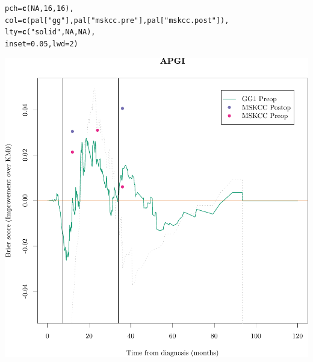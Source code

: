 \documentclass{article}\usepackage[]{graphicx}\usepackage[]{color}
\makeatletter
\def\maxwidth{ %
  \ifdim\Gin@nat@width>\linewidth
    \linewidth
  \else
    \Gin@nat@width
  \fi
}
\newcommand{\hlnum}[1]{\textcolor[rgb]{0.686,0.059,0.569}{#1}}%
\newcommand{\hlstr}[1]{\textcolor[rgb]{0.192,0.494,0.8}{#1}}%
\newcommand{\hlstd}[1]{\textcolor[rgb]{0.345,0.345,0.345}{#1}}%
\newcommand{\hlkwc}[1]{\textcolor[rgb]{0.333,0.667,0.333}{#1}}%
\newcommand{\hlkwd}[1]{\textcolor[rgb]{0.737,0.353,0.396}{\textbf{#1}}}%
\newenvironment{kframe}{%
 \def\at@end@of@kframe{}%
 \ifinner\ifhmode%
  \def\at@end@of@kframe{\end{minipage}}%
  \begin{minipage}{\columnwidth}%
 \fi\fi%
 \def\FrameCommand##1{\hskip\@totalleftmargin \hskip-\fboxsep
 \colorbox{shadecolor}{##1}\hskip-\fboxsep
     \hskip-\linewidth \hskip-\@totalleftmargin \hskip\columnwidth}%
 \MakeFramed {\advance\hsize-\width
   \@totalleftmargin\z@ \linewidth\hsize
   \@setminipage}}%
 {\par\unskip\endMakeFramed%
 \at@end@of@kframe}
\newenvironment{knitrout}{}{} %
\makeatother
\begin{document}
\begin{knitrout}
\begin{kframe}
\begin{alltt}
        \hlkwc{pch} \hlstd{=} \hlkwd{c}\hlstd{(}        \hlnum{NA}\hlstd{,}                     \hlnum{16}\hlstd{,}                             \hlnum{16}\hlstd{),}
        \hlkwc{col} \hlstd{=} \hlkwd{c}\hlstd{(        pal[}\hlstr{"gg"}\hlstd{],              pal[}\hlstr{"mskcc.pre"}\hlstd{],       pal[}\hlstr{"mskcc.post"}\hlstd{]),}
        \hlkwc{lty} \hlstd{=} \hlkwd{c}\hlstd{(}        \hlstr{"solid"}\hlstd{,}                \hlnum{NA}\hlstd{,}                             \hlnum{NA}\hlstd{),}
        \hlkwc{inset} \hlstd{=} \hlnum{0.05}\hlstd{,} \hlkwc{lwd} \hlstd{=} \hlnum{2}\hlstd{)}
\end{alltt}
\end{kframe}

{\centering \includegraphics[width=\maxwidth]{figure/07-prob-bs-paths-plot-apgi-3} 

}



\end{knitrout}
\end{document}
